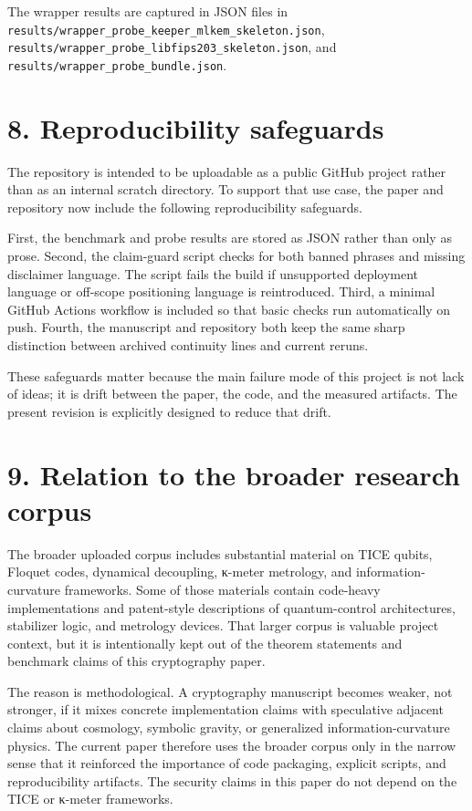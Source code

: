 \documentclass[
  11pt,
]{article}
\begin{document}
The wrapper results are captured in JSON files in
\texttt{results/wrapper\_probe\_keeper\_mlkem\_skeleton.json},
\texttt{results/wrapper\_probe\_libfips203\_skeleton.json}, and
\texttt{results/wrapper\_probe\_bundle.json}.

\section{8. Reproducibility
safeguards}\label{reproducibility-safeguards}

The repository is intended to be uploadable as a public GitHub project
rather than as an internal scratch directory. To support that use case,
the paper and repository now include the following reproducibility
safeguards.

First, the benchmark and probe results are stored as JSON rather than
only as prose. Second, the claim-guard script checks for both banned
phrases and missing disclaimer language. The script fails the build if
unsupported deployment language or off-scope positioning language is
reintroduced. Third, a minimal GitHub Actions workflow is included so
that basic checks run automatically on push. Fourth, the manuscript and
repository both keep the same sharp distinction between archived
continuity lines and current reruns.

These safeguards matter because the main failure mode of this project is
not lack of ideas; it is drift between the paper, the code, and the
measured artifacts. The present revision is explicitly designed to
reduce that drift.

\section{9. Relation to the broader research
corpus}\label{relation-to-the-broader-research-corpus}

The broader uploaded corpus includes substantial material on TICE
qubits, Floquet codes, dynamical decoupling, κ-meter metrology, and
information-curvature frameworks. Some of those materials contain
code-heavy implementations and patent-style descriptions of
quantum-control architectures, stabilizer logic, and metrology devices.
That larger corpus is valuable project context, but it is intentionally
kept out of the theorem statements and benchmark claims of this
cryptography paper.

The reason is methodological. A cryptography manuscript becomes weaker,
not stronger, if it mixes concrete implementation claims with
speculative adjacent claims about cosmology, symbolic gravity, or
generalized information-curvature physics. The current paper therefore
uses the broader corpus only in the narrow sense that it reinforced the
importance of code packaging, explicit scripts, and reproducibility
artifacts. The security claims in this paper do not depend on the TICE
or κ-meter frameworks.
\end{document}
